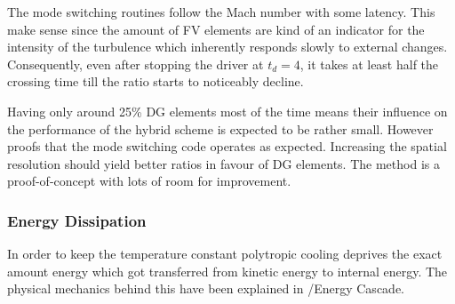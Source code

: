 The mode switching routines follow the Mach number with some latency. This make
sense since the amount of FV elements are kind of an indicator for the
intensity of the turbulence which inherently responds slowly to external
changes. Consequently, even after stopping the driver at $t_d = 4$, it takes at
least half the crossing time till the ratio starts to noticeably decline.

Having only around 25\% DG elements most of the time means their influence on
the performance of the hybrid scheme is expected to be rather small.  However
 proofs that the mode switching
code operates as expected. Increasing the spatial resolution should yield
better ratios in favour of DG elements. The method is a proof-of-concept with
lots of room for improvement.


\subsubsection{Energy Dissipation}
\label{sec:stirturb-energy-dissipation}
In order to keep the temperature constant polytropic cooling deprives the exact
amount energy which got transferred from kinetic energy to internal energy. The
physical mechanics behind this have been explained in /Energy
Cascade.


